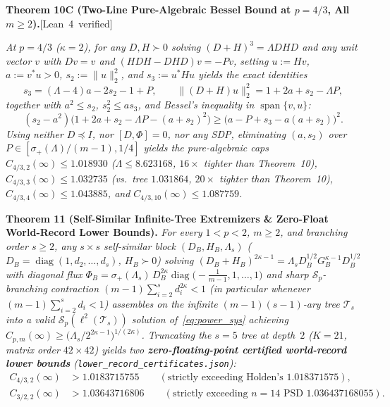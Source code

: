 \documentclass[10pt,letterpaper]{article}
\newcommand{\leanbadge}[1]{\mbox{\sffamily\scriptsize\color{leanborder}[#1]}}
\newcommand{\Sp}{\mathcal{S}_p}
\newcommand{\diag}{\operatorname{diag}}
\begin{document}
\begin{tcolorbox}[mathbox]
\textbf{Theorem 10C (Two-Line Pure-Algebraic Bessel Bound at $p = 4/3$, All $m \ge 2$).}\hfill\leanbadge{Lean~4 verified}\par\vspace{1.5pt}
\emph{At $p = 4/3$ ($\kappa = 2$), for any $D, H \succ 0$ solving $(D+H)^3 = \Lambda D H D$ and any unit vector $v$ with $Dv = v$ and $(HDH - DHD)v = -Pv$, setting $u := Hv$, $a := v^* u > 0$, $s_2 := \|u\|_2^2$, and $s_3 := u^* H u$ yields the exact identities}
\[
  s_3 = (\Lambda - 4)a - 2s_2 - 1 + P,
  \qquad
  \|(D + H)u\|_2^2 = 1 + 2a + s_2 - \Lambda P,
\]
\emph{together with $a^2 \le s_2$, $s_2^2 \le a s_3$, and Bessel's inequality in $\operatorname{span}\{v, u\}$:}
\[
  (s_2 - a^2)\bigl(1 + 2a + s_2 - \Lambda P - (a + s_2)^2\bigr) \ge \bigl(a - P + s_3 - a(a + s_2)\bigr)^2.
\]
\emph{Using neither $D \preceq I$, nor $[D, \Phi] = 0$, nor any SDP, eliminating $(a, s_2)$ over $P \in [\sigma_+(\Lambda)/(m-1), 1/4]$ yields the pure-algebraic caps $C_{4/3,2}(\infty) \le 1.018930$ ($\Lambda \le 8.623168$, $16\times$ tighter than Theorem~10), $C_{4/3,3}(\infty) \le 1.032735$ (vs.\ tree $1.031864$, $20\times$ tighter than Theorem~10), $C_{4/3,4}(\infty) \le 1.043885$, and $C_{4/3,10}(\infty) \le 1.087759$.}
\end{tcolorbox}

\begin{tcolorbox}[mathbox]
\textbf{Theorem 11 (Self-Similar Infinite-Tree Extremizers \& Zero-Float World-Record Lower Bounds).}
\emph{For every $1 < p < 2$, $m \ge 2$, and branching order $s \ge 2$, any $s \times s$ self-similar block $(D_B, H_B, \Lambda_s)$ ($D_B = \diag(1, d_2,\dots,d_s)$, $H_B \succ 0$) solving $(D_B+H_B)^{2\kappa-1} = \Lambda_s D_B^{1/2} G_B^{\kappa-1} D_B^{1/2}$ with diagonal flux $\Phi_B = \sigma_+(\Lambda_s)\,D_B^{2\kappa}\diag\bigl(-\frac{1}{m-1}, 1, \dots, 1\bigr)$ and sharp $\Sp$-branching contraction $(m-1)\sum_{i=2}^s d_i^{2\kappa} < 1$ (in particular whenever $(m-1)\sum_{i=2}^s d_i < 1$) assembles on the infinite $(m-1)(s-1)$-ary tree $\mathcal{T}_s$ into a valid $\Sp(\ell^2(\mathcal{T}_s))$ solution of~\eqref{eq:power_sys} achieving $C_{p,m}(\infty) \ge \bigl(\Lambda_s / 2^{2\kappa-1}\bigr)^{1/(2\kappa)}$. Truncating the $s = 5$ tree at depth~$2$ ($K = 21$, matrix order $42\times 42$) yields two \textbf{zero-floating-point certified world-record lower bounds} (\texttt{lower\_record\_certificates.json}):}
\begin{align*}
  C_{4/3,2}(\infty) &> 1.0183715755 \qquad (\text{strictly exceeding Holden's } 1.018371575), \\
  C_{3/2,2}(\infty) &> 1.03643716806 \qquad (\text{strictly exceeding } n = 14 \text{ PSD } 1.036437168055).
\end{align*}
\end{tcolorbox}
\end{document}
